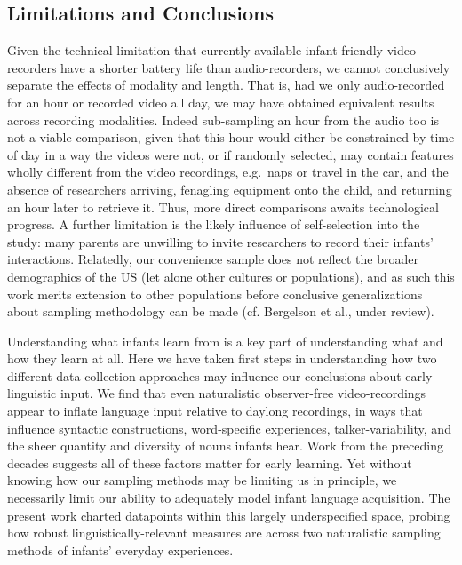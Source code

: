 \documentclass[man]{apa6}
\theoremstyle{definition}
\theoremstyle{definition}
\theoremstyle{definition}
\theoremstyle{remark}
\begin{document}
\subsection{Limitations and
Conclusions}\label{limitations-and-conclusions}

Given the technical limitation that currently available infant-friendly
video-recorders have a shorter battery life than audio-recorders, we
cannot conclusively separate the effects of modality and length. That
is, had we only audio-recorded for an hour or recorded video all day, we
may have obtained equivalent results across recording modalities. Indeed
sub-sampling an hour from the audio too is not a viable comparison,
given that this hour would either be constrained by time of day in a way
the videos were not, or if randomly selected, may contain features
wholly different from the video recordings, e.g.~naps or travel in the
car, and the absence of researchers arriving, fenagling equipment onto
the child, and returning an hour later to retrieve it. Thus, more direct
comparisons awaits technological progress. A further limitation is the
likely influence of self-selection into the study: many parents are
unwilling to invite researchers to record their infants' interactions.
Relatedly, our convenience sample does not reflect the broader
demographics of the US (let alone other cultures or populations), and as
such this work merits extension to other populations before conclusive
generalizations about sampling methodology can be made (cf. Bergelson et
al., under review).

Understanding what infants learn from is a key part of understanding
what and how they learn at all. Here we have taken first steps in
understanding how two different data collection approaches may influence
our conclusions about early linguistic input. We find that even
naturalistic observer-free video-recordings appear to inflate language
input relative to daylong recordings, in ways that influence syntactic
constructions, word-specific experiences, talker-variability, and the
sheer quantity and diversity of nouns infants hear. Work from the
preceding decades suggests all of these factors matter for early
learning. Yet without knowing how our sampling methods may be limiting
us in principle, we necessarily limit our ability to adequately model
infant language acquisition. The present work charted datapoints within
this largely underspecified space, probing how robust
linguistically-relevant measures are across two naturalistic sampling
methods of infants' everyday experiences. \newpage
\end{document}
